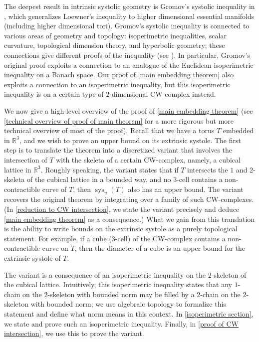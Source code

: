\documentclass[12pt]{amsart}
\DeclareMathOperator*{\sys}{sys}
\theoremstyle{definition}
\begin{document}
The deepest result in intrinsic systolic geometry is Gromov's systolic inequality in \cite{Gro83}, which generalizes Loewner's inequality to higher dimensional essential manifolds (including higher dimensional tori). Gromov's systolic inequality is connected to various areas of geometry and topology: isoperimetric inequalities, scalar curvature, topological dimension theory, and hyperbolic geometry; these connections give different proofs of the inequality (see \cite{Gut10}). In particular, Gromov's original proof exploits a connection to an analogue of the Euclidean isoperimetric inequality on a Banach space. Our proof of \cref{main embedding theorem} also exploits a connection to an isoperimetric inequality, but this isoperimetric inequality is on a certain type of $2$-dimensional CW-complex instead.

We now give a high-level overview of the proof of \cref{main embedding theorem} (see \cref{technical overview of proof of main theorem} for a more rigorous but more technical overview of most of the proof). Recall that we have a torus $T$ embedded in $\mathbb{R}^3$, and we wish to prove an upper bound on its extrinsic systole. The first step is to translate the theorem into a discretized variant that involves the intersection of $T$ with the skeleta of a certain CW-complex, namely, a cubical lattice in $\mathbb{R}^3$. Roughly speaking, the variant states that if $T$ intersects the $1$ and $2$-skeleta of the cubical lattice in a bounded way, and no $3$-cell contains a non-contractible curve of $T$, then $\sys_u(T)$ also has an upper bound. The variant recovers the original theorem by integrating over a family of such CW-complexes. (In \cref{reduction to CW intersection}, we state the variant precisely and deduce \cref{main embedding theorem} as a consequence.) What we gain from this translation is the ability to write bounds on the extrinsic systole as a purely topological statement. For example, if a cube ($3$-cell) of the CW-complex contains a non-contractible curve on $T$, then the diameter of a cube is an upper bound for the extrinsic systole of $T$. 

The variant is a consequence of an isoperimetric inequality on the $2$-skeleton of the cubical lattice. Intuitively, this isoperimetric inequality states that any $1$-chain on the $2$-skeleton with bounded norm may be filled by a $2$-chain on the $2$-skeleton with bounded norm; we use algebraic topology to formalize this statement and define what norm means in this context. In \cref{isoperimetric section}, we state and prove such an isoperimetric inequality. Finally, in \cref{proof of CW intersection}, we use this to prove the variant.
\end{document}
